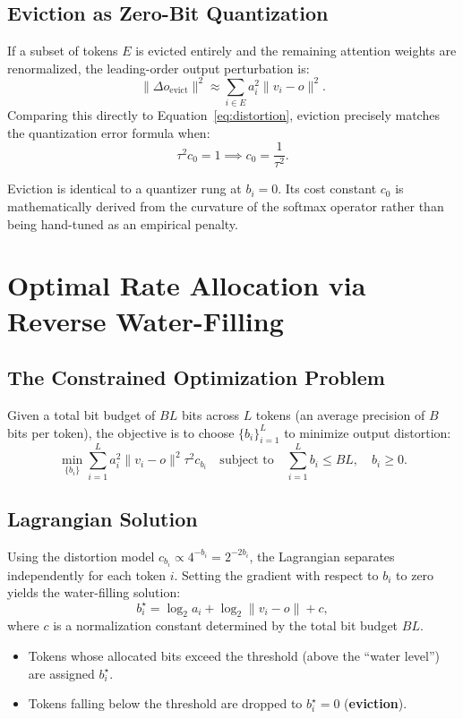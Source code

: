\subsection{Eviction as Zero-Bit Quantization}
If a subset of tokens $E$ is evicted entirely and the remaining attention weights are renormalized, the leading-order output perturbation is:
\begin{equation}
    \|\Delta o_{\mathrm{evict}}\|^2 \approx \sum_{i \in E} a_i^2 \|v_i - o\|^2.
\end{equation}
Comparing this directly to Equation~\eqref{eq:distortion}, eviction precisely matches the quantization error formula when:
\begin{equation}
    \tau^2 c_0 = 1 \implies c_0 = \frac{1}{\tau^2}.
\end{equation}
\begin{remark}
Eviction is identical to a quantizer rung at $b_i = 0$. Its cost constant $c_0$ is mathematically derived from the curvature of the softmax operator rather than being hand-tuned as an empirical penalty.
\end{remark}


\section{Optimal Rate Allocation via Reverse Water-Filling}

\subsection{The Constrained Optimization Problem}
Given a total bit budget of $BL$ bits across $L$ tokens (an average precision of $B$ bits per token), the objective is to choose $\{b_i\}_{i=1}^L$ to minimize output distortion:
\begin{equation}
    \min_{\{b_i\}} \sum_{i=1}^L a_i^2 \|v_i - o\|^2 \tau^2 c_{b_i} \quad \text{subject to} \quad \sum_{i=1}^L b_i \le B L, \quad b_i \ge 0.
\end{equation}

\subsection{Lagrangian Solution}
Using the distortion model $c_{b_i} \propto 4^{-b_i} = 2^{-2b_i}$, the Lagrangian separates independently for each token $i$. Setting the gradient with respect to $b_i$ to zero yields the water-filling solution:
\begin{equation}
    b_i^\star = \log_2 a_i + \log_2 \|v_i - o\| + c,
\end{equation}
where $c$ is a normalization constant determined by the total bit budget $BL$.
\begin{itemize}
    \item Tokens whose allocated bits exceed the threshold (above the ``water level'') are assigned $b_i^\star$.
    \item Tokens falling below the threshold are dropped to $b_i^\star = 0$ (\textbf{eviction}).
\end{itemize}

